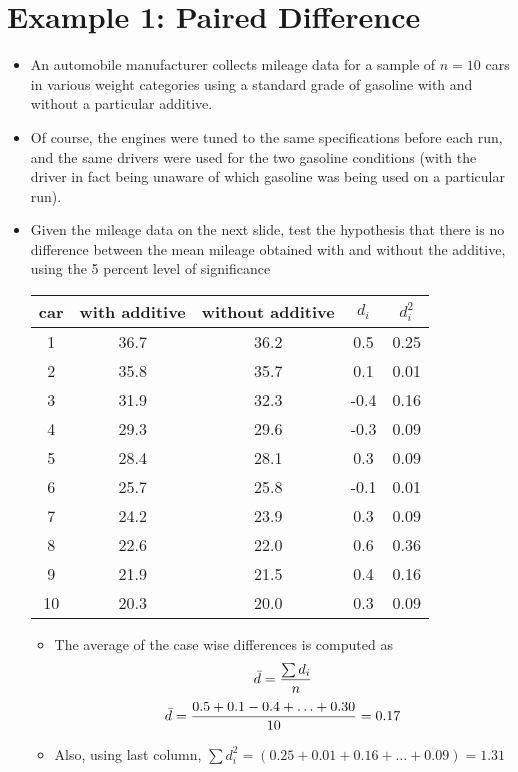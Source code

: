 \documentclass[a4paper,12pt]{article}
\begin{document}
\section*{Example 1: Paired Difference}
\begin{itemize}
\item An automobile manufacturer collects mileage data for a sample of $n = 10$ cars in various weight categories
using a standard grade of gasoline with and without a particular additive. \item Of course, the engines were tuned to the same
specifications before each run, and the same drivers were used for the two gasoline conditions (with the driver in fact being
unaware of which gasoline was being used on a particular run). \item Given the mileage data on the next slide,  test the hypothesis
that there is no difference between the mean mileage obtained with and without the additive, using the 5 percent level of
significance 



\begin{center}
\begin{tabular}{|c|c|c|c|c|}\hline
car & with additive & without additive & $d_i$ & $d^2_i$\\\hline
1&36.7&36.2&0.5&0.25\\\hline
2&35.8&35.7&0.1&0.01\\\hline
3&31.9&32.3&-0.4&0.16\\\hline
4&29.3&29.6&-0.3&0.09\\\hline
5&28.4&28.1&0.3&0.09\\\hline
6&25.7&25.8&-0.1&0.01\\\hline
7&24.2&23.9&0.3&0.09\\\hline
8&22.6&22.0&0.6&0.36\\\hline
9&21.9&21.5&0.4&0.16\\\hline
10&20.3&20.0&0.3&0.09\\\hline
\end{tabular}
\end{center}


\begin{itemize}
\item The average of the case wise differences is computed as \[\bar{d} = {\sum d_i \over n}\]
\[ \bar{d} = { 0.5 + 0.1  - 0.4 + \ldots + 0.30 \over 10 }= 0.17 \]
\item Also, using last column, $\sum d^2_i = (0.25 + 0.01 + 0.16 + \ldots + 0.09) = 1.31$
\end{itemize}



\end{itemize}
\end{document}
